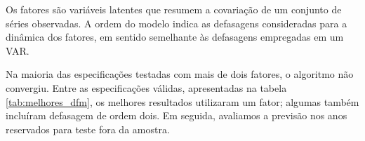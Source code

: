 Os fatores são variáveis latentes que resumem a covariação de um conjunto de séries observadas. A ordem do modelo indica as defasagens consideradas para a dinâmica dos fatores, em sentido semelhante às defasagens empregadas em um VAR.

Na maioria das especificações testadas com mais de dois fatores, o algoritmo não convergiu. Entre as especificações válidas, apresentadas na tabela \ref{tab:melhores_dfm}, os melhores resultados utilizaram um fator; algumas também incluíram defasagem de ordem dois. Em seguida, avaliamos a previsão nos anos reservados para teste fora da amostra.

\begin{table}[htbp]
	\centering
	\captionsetup{justification=centering}
	\caption{Melhores modelos DFM validos}
	\label{tab:melhores_dfm}
	
	\scriptsize
	\setlength{\tabcolsep}{2pt}
	\renewcommand{\arraystretch}{1.3}
	

\end{table}
